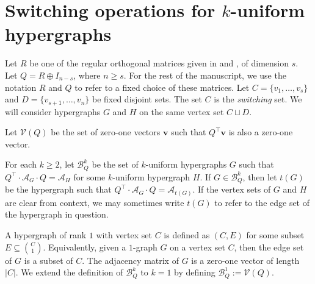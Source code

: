 \documentclass[12pt]{article}
\numberwithin{equation}{section}
\theoremstyle{definition}
\newcommand{\ev}[1]{( #1 )}
\begin{document}

\section{Switching operations for \texorpdfstring{$k$}{k}-uniform hypergraphs}
\label{sec:Ecospectralityswitching}

Let $R$ be one of the regular orthogonal matrices given in  and , of dimension $s$. Let $Q = R \oplus I_{n-s}$, where $n\geq s$. For the rest of the manuscript, we use the notation $R$ and $Q$ to refer to a fixed choice of these matrices. Let $C = \{ v_1,\ldots,v_s\}$ and $D = \{ v_{s+1},\ldots,v_n\}$ be fixed disjoint sets. The set $C$ is the \textit{switching} set. We will consider hypergraphs $G$ and $H$ on the same vertex set $C\sqcup D$. 

Let $\mathcal{V}\ev{Q}$ be the set of zero-one vectors $\mathbf{v}$ such that $Q^\top \mathbf{v}$ is also a zero-one vector.

For each $k\geq 2$, let $\mathcal{B}^{k}_Q$ be the set of $k$-uniform hypergraphs $G$ such that $Q^\top \cdot \mathcal{A}_G \cdot Q = \mathcal{A}_H $ for some $k$-uniform hypergraph $H$. If $G \in \mathcal{B}^{k}_Q$, then let $t\ev{G}$ be the hypergraph such that $Q^\top \cdot \mathcal{A}_G \cdot Q = \mathcal{A}_{t\ev{G}} $. If the vertex sets of $G$ and $H$ are clear from context, we may sometimes write $t\ev{G}$ to refer to the edge set of the hypergraph in question.

A hypergraph of rank $1$ with vertex set $C$ is defined as $\ev{C,E}$ for some subset $E\subseteq \binom{C}{1}$. Equivalently, given a $1$-graph $G$ on a vertex set $C$, then the edge set of $G$ is a subset of $C$. The adjacency matrix of $G$ is a zero-one vector of length $|C|$. We extend the definition of $\mathcal{B}^{k}_Q$ to $k=1$ by defining $\mathcal{B}^{1}_Q := \mathcal{V}\ev{Q}$. 
\end{document}
